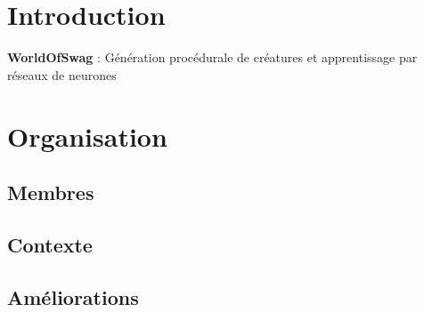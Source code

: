 \hypertarget{index_intro_sec}{}\section{Introduction}\label{index_intro_sec}
{\bfseries World\+Of\+Swag} \+: Génération procédurale de créatures et apprentissage par réseaux de neurones\hypertarget{index_Organisation}{}\section{Organisation}\label{index_Organisation}
\hypertarget{index_Membres}{}\subsection{Membres}\label{index_Membres}
\hypertarget{index_Contexte}{}\subsection{Contexte}\label{index_Contexte}
\hypertarget{mainpage.dox_Améliorations}{}\subsection{Améliorations}\label{mainpage.dox_Améliorations}

